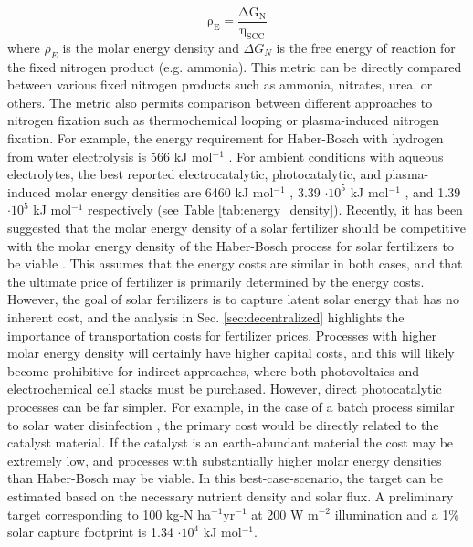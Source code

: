 \begin{equation}
\mathrm{
\rho_{E} = \frac{\Delta G_{N}}{\eta_{SCC}}
}
\label{eq:eng_dens}
\end{equation}
where $\rho_{E}$ is the molar energy density and $\Delta G_{N}$ is the free energy of reaction for the fixed nitrogen product (e.g. ammonia). This metric can be directly compared between various fixed nitrogen products such as ammonia, nitrates, urea, or others. The metric also permits comparison between different approaches to nitrogen fixation such as thermochemical looping or plasma-induced nitrogen fixation. For example, the energy requirement for Haber-Bosch with hydrogen from water electrolysis is 566 kJ mol$^{-1}$ \cite{Grundt_1982}. For ambient conditions with aqueous electrolytes, the best reported electrocatalytic, photocatalytic, and plasma-induced molar energy densities are  6460 kJ mol$^{-1}$ \cite{Song_2018}, 3.39 $\cdot 10^5$ kJ mol$^{-1}$  \cite{Shiraishi_2018}, and 1.39 $\cdot 10^5$ kJ mol$^{-1}$ \cite{Hawtof_2019} respectively (see Table \ref{tab:energy_density}). Recently, it has been suggested that the molar energy density of a solar fertilizer should be competitive with the molar energy density of the Haber-Bosch process for solar fertilizers to be viable \cite{Suryanto_2019}. This assumes that the energy costs are similar in both cases, and that the ultimate price of fertilizer is primarily determined by the energy costs. However, the goal of solar fertilizers is to capture latent solar energy that has no inherent cost, and the analysis in Sec. \ref{sec:decentralized} highlights the importance of transportation costs for fertilizer prices. Processes with higher molar energy density will certainly have higher capital costs, and this will likely become prohibitive for indirect approaches, where both photovoltaics and electrochemical cell stacks must be purchased. However, direct photocatalytic processes can be far simpler. For example, in the case of a batch process similar to solar water disinfection \cite{Lonnen_2005}, the primary cost would be directly related to the catalyst material. If the catalyst is an earth-abundant material the cost may be extremely low, and processes with substantially higher molar energy densities than Haber-Bosch may be viable. In this best-case-scenario, the target can be estimated based on the necessary nutrient density and solar flux. A preliminary target corresponding to 100 kg-N ha$^{-1}$yr$^{-1}$ at 200 W m$^{-2}$ illumination and a 1\% solar capture footprint is 1.34 $\cdot 10^4$ kJ mol$^{-1}$. 

